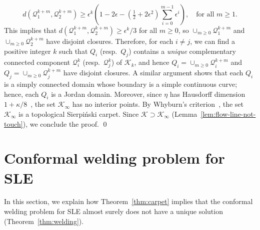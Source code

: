 \documentclass[a4paper]{article}
\numberwithin{equation}{section}
\numberwithin{equation}{section}
\renewcommand{\1}{\mathbf{1}}
\begin{document}
    \[ d(\mathcal Q_1^{k+m},\mathcal Q_2^{k+m}) \ge \epsilon^k(1-2 \epsilon - (\tfrac{1}{2} + 2\epsilon^2) \sum_{i=0}^{m-1} \epsilon^i), \quad \mbox{for all } m \ge 1. \]
    This implies that $d(\mathcal Q_1^{k+m},\mathcal Q_2^{k+m}) \ge \epsilon^k/3$ for all $m \ge 0$, so $\cup_{m \ge 0} \mathcal Q_1^{k+m}$ and $\cup_{m \ge 0} \mathcal Q_2^{k+m}$ have disjoint closures.
    Therefore, for each $i\neq j$, we can find a positive integer $k$ such that $Q_i$ (resp.\ $Q_j$) contains a \emph{unique} complementary connected component $\mathcal Q_i^k$ (resp.\ $\mathcal Q_j^k$) of $\mathcal{K}_k$, and hence $Q_i=\cup_{m \ge 0} \mathcal Q_i^{k+m}$ and $Q_j=\cup_{m \ge 0} \mathcal Q_j^{k+m}$ have disjoint closures. A similar argument shows that each $Q_i$ is a simply connected domain whose boundary is a simple continuous curve; hence, each $Q_i$ is a Jordan domain.
    Moreover, since $\eta$ has Hausdorff dimension $1+\kappa/8$~\cite{Beffara-dimension}, the set $\mathcal{K}_\infty$ has no interior points. By Whyburn's criterion~\cite{Whyburn-carpet}, the set $\mathcal{K}_\infty$ is a topological Sierpi\'nski carpet. Since $\mathcal{K} \supset \mathcal{K}_\infty$ (Lemma~\ref{lem:flow-line-not-touch}), we conclude the proof. \qed
    
\section{Conformal welding problem for SLE}\label{sec:welding}

In this section, we explain how Theorem~\ref{thm:carpet} implies that the conformal welding problem for SLE almost surely does not have a unique solution (Theorem~\ref{thm:welding}).
\end{document}
